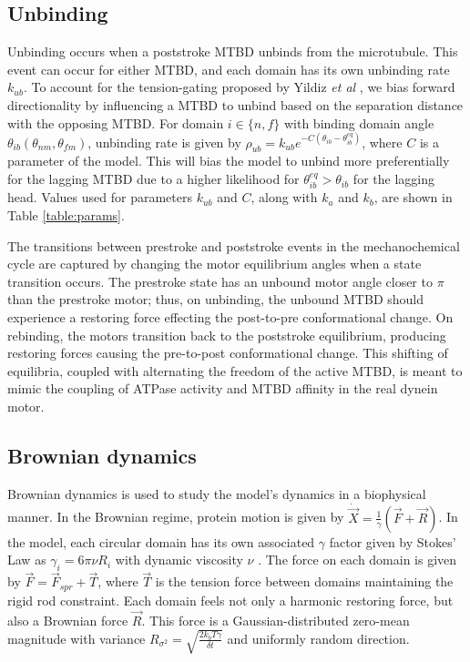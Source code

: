 \documentclass[9pt,twocolumn,twoside]{article}
\begin{document}
\subsection*{Unbinding}
Unbinding occurs when a poststroke MTBD unbinds from the microtubule. This event can occur for either MTBD, and each domain has its own unbinding rate $k_{ub}$. To account for the tension-gating proposed by Yildiz \textit{et al} \cite{yildizcleary}, we bias forward directionality by influencing a MTBD to unbind based on the separation distance with the opposing MTBD. For domain $i \in \{n, f\}$ with binding domain angle $\theta_{ib}\left(\theta_{nm}, \theta_{fm}\right)$, unbinding rate is given by $\rho_{ub} = k_{ub}e^{-C\left(\theta_{ib}-\theta^{eq}_{ib}\right)}$, where $C$ is a parameter of the model. This will bias the model to unbind more preferentially for the lagging MTBD due to a higher likelihood for $\theta^{eq}_{ib} > \theta_{ib}$ for the lagging head. Values used for parameters $k_{ub}$ and $C$, along with $k_a$ and $k_b$, are shown in Table \ref{table:params}.

The transitions between prestroke and poststroke events in the mechanochemical cycle \cite{cianfrocco} are captured by changing the motor equilibrium angles when a state transition occurs. The prestroke state has an unbound motor angle closer to $\pi$ than the prestroke motor\cite{burgess-paper}; thus, on unbinding, the unbound MTBD should experience a restoring force effecting the post-to-pre conformational change. On rebinding, the motors transition back to the poststroke equilibrium, producing restoring forces causing the pre-to-post conformational change. This shifting of equilibria, coupled with alternating the freedom of the active MTBD, is meant to mimic the coupling of ATPase activity and MTBD affinity in the real dynein motor.

\subsection*{Brownian dynamics}
Brownian dynamics is used to study the model's dynamics in a biophysical manner. In the Brownian regime, protein motion is given by $\dot{\vec{X}} = \frac{1}{\gamma}\left(\vec{F}+\vec{R}\right)$. In the model, each circular domain has its own associated $\gamma$ factor given by Stokes' Law as $\gamma_i = 6\pi\nu R_i$ with dynamic viscosity $\nu$ \cite{stokeslaw}. The force on each domain is given by $\vec{F} = \vec{F}_{spr} + \vec{T}$, where $\vec{T}$ is the tension force between domains maintaining the rigid rod constraint. Each domain feels not only a harmonic restoring force, but also a Brownian force $\vec{R}$. This force is a Gaussian-distributed zero-mean magnitude with variance $R_{\sigma^2} = \sqrt{\frac{2k_bT\gamma}{\delta t}}$ and uniformly random direction.
\end{document}
